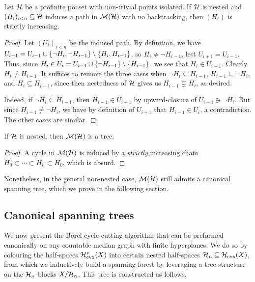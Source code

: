 \documentclass[reqno]{amsart}
\begin{document}
    \begin{lemma}
        Let $\mathcal{H}$ be a profinite pocset with non-trivial points isolated. If $\mathcal{H}$ is nested and $(H_i)_{i<n}\subseteq\mathcal{H}$ induces a path in $\mathcal{M}(\mathcal{H})$ with no backtracking, then $(H_i)$ is strictly increasing.
    \end{lemma}
    \begin{proof}
        Let $(U_i)_{i<n}$ be the induced path. By definition, we have $U_{i+1}=U_{i-1}\cup\{\lnot H_i,\lnot H_{i-1}\}\setminus\left\{H_i,H_{i-1}\right\}$, so $H_i\neq\lnot H_{i-1}$, lest $U_{i+1}=U_{i-1}$. Thus, since $H_i\in U_i=U_{i-1}\cup\{\lnot H_{i-1}\}\setminus\left\{H_{i-1}\right\}$, we see that $H_i\in U_{i-1}$. Clearly $H_i\neq H_{i-1}$. It suffices to remove the three cases when $\lnot H_i\subseteq H_{i-1}$, $H_{i-1}\subseteq\lnot H_i$, and $H_i\subseteq H_{i-1}$, since then nestedness of $\mathcal{H}$ gives us $H_{i-1}\subsetneq H_i$, as desired.

        Indeed, if $\lnot H_i\subseteq H_{i-1}$, then $H_{i-1}\in U_{i+1}$ by upward-closure of $U_{i+1}\ni\lnot H_i$. But since $H_{i-1}\neq\lnot H_i$, we have by definition of $U_{i+1}$ that $H_{i-1}\in U_i$, a contradiction. The other cases are similar.
    \end{proof}

    \begin{corollary}\label{cor:nested_implies_tree}
        If $\mathcal{H}$ is nested, then $\mathcal{M}(\mathcal{H})$ is a tree.
    \end{corollary}
    \begin{proof}
        A cycle in $\mathcal{M}(\mathcal{H})$ is induced by a \textit{strictly} increasing chain $H_0\subset\cdots\subset H_n\subset H_0$, which is absurd.
    \end{proof}

    Nonetheless, in the general non-nested case, $\mathcal{M}(\mathcal{H})$ still admits a {\color{red}canonical} spanning tree, which we prove in the following section.

    \subsection{{\color{red}Canonical} spanning trees}\label{sec:cycle_cutting_algorithm}

    We now present the Borel cycle-cutting algorithm that can be preformed {\color{red}canonically} on any countable median graph with finite hyperplanes. We do so by colouring the half-spaces $\mathcal{H}^\ast_\mathrm{cvx}(X)$ into certain nested half-spaces $\mathcal{H}_n\subseteq\mathcal{H}_\mathrm{cvx}(X)$, from which we inductively build a spanning forest by leveraging a tree structure on the $\mathcal{H}_n$-blocks $X/\mathcal{H}_n$. This tree is constructed as follows.
\end{document}
